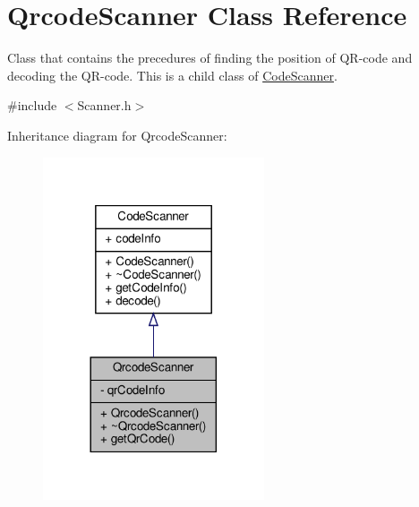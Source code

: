 \hypertarget{class_qrcode_scanner}{}\section{Qrcode\+Scanner Class Reference}
\label{class_qrcode_scanner}


Class that contains the precedures of finding the position of Q\+R-\/code and decoding the Q\+R-\/code. This is a child class of \hyperlink{class_code_scanner}{Code\+Scanner}.  




{\ttfamily \#include $<$Scanner.\+h$>$}



Inheritance diagram for Qrcode\+Scanner\+:
\nopagebreak
\begin{figure}[H]
\begin{center}
\leavevmode
\includegraphics[width=185pt]{class_qrcode_scanner__inherit__graph}
\end{center}
\end{figure}


